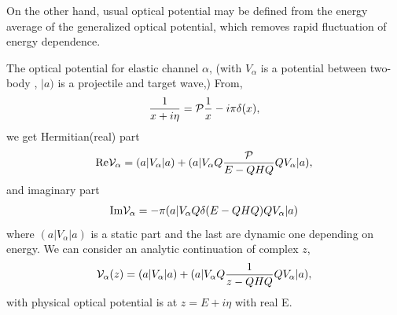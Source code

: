 \documentclass[11pt]{book}
\newcommand{\bea}{\begin{eqnarray}}
\newcommand{\eea}{\end{eqnarray}}
\begin{document}
On the other hand, usual optical potential may be defined from
the energy average of the generalized optical potential, 
which removes rapid fluctuation of energy dependence.  

The optical potential for elastic channel $\alpha$, (with $V_\alpha$ is a potential between two-body
, $|a)$ is a projectile and target wave,) 
From, 
\bea 
\frac{1}{x+i\eta}={\cal P}\frac{1}{x}-i\pi\delta(x),
\eea  
we get Hermitian(real) part 
\bea 
\mbox{Re}{\cal V}_\alpha = (a|V_\alpha|a)+(a|V_\alpha Q \frac{\cal P}{E-QHQ} Q V_\alpha|a ),
\eea 
and imaginary part 
\bea 
\mbox{Im}{\cal V}_\alpha = -\pi (a|V_\alpha Q \delta(E-QHQ)QV_\alpha|a)
\eea 
where $(a|V_\alpha|a)$ is a static part and the last are dynamic one depending on energy. 
We can consider an analytic continuation of complex $z$,
\bea 
{\cal V}_\alpha(z) =  (a|V_\alpha|a)+(a|V_\alpha Q \frac{1}{z-QHQ} Q V_\alpha|a ),
\eea 
with physical optical potential is at $z=E+i\eta$ with real E. 
\end{document}
